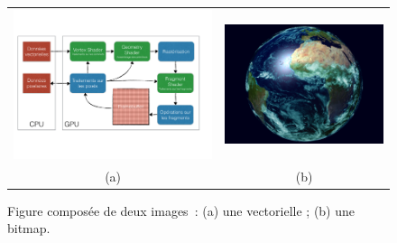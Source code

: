 \documentclass[a4paper, 12pt]{book}
\begin{document}
\begin{figure}[htbp]
  \centering
  \begin{tabular}{cc}
    \includegraphics[height=0.15\textheight]{fig/pipeline.pdf}&
    \includegraphics[height=0.15\textheight]{images/earth_06_rendu_final.png}\\
    (a)&(b)
  \end{tabular}
  \caption{Figure composée de deux images~: (a) une vectorielle ; (b) une bitmap.\label{fig-tab}}
\end{figure}
\end{document}
